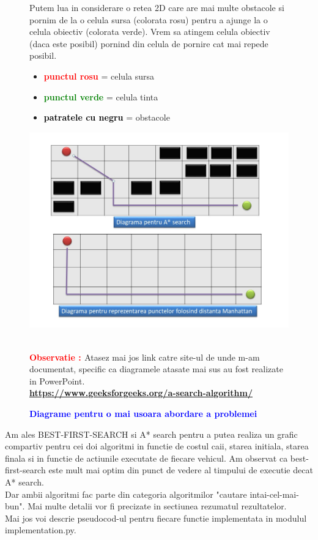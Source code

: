 \documentclass{article}
\begin{document}
\newpage
\begin{figure}
\sffamily
\quad Putem lua in considerare o retea 2D care are mai multe obstacole si pornim de la o celula sursa (colorata rosu) pentru a ajunge la o celula obiectiv (colorata verde).  Vrem sa atingem celula obiectiv (daca este posibil) pornind din celula de pornire cat mai repede posibil. \par
\newpage
  \vspace{7mm}
  \centering
  \begin{itemize}
     \item \textcolor{red}{\bfseries punctul rosu} = celula sursa
     \item \textcolor{green}{\bfseries punctul verde} = celula tinta
     \item \textcolor{black}{\bfseries patratele cu negru} = obstacole
 \end{itemize}
   \includegraphics[width=13cm]{diagrame.jpg}
  \bfseries\caption{\textbf{\textcolor{blue}{Diagrame pentru o mai usoara abordare a problemei }}}
  \vspace{2cm}
  \quad \textbf{\textcolor{red}{\\ Observatie : }}Atasez mai jos link catre site-ul de unde m-am documentat, specific ca diagramele atasate mai sus au fost realizate in PowerPoint.\\
  \bfseries{\textcolor{blue}{\url{https://www.geeksforgeeks.org/a-search-algorithm/}}}
\end{figure}

\vspace{10mm}
\quad Am ales BEST-FIRST-SEARCH si A* search pentru a putea realiza un grafic compartiv pentru cei doi algoritmi in functie de costul caii, starea initiala, starea finala si in functie de actiunile executate de fiecare vehicul. Am observat ca best-first-search este mult mai optim din punct de vedere al timpului de executie decat A* search.\\ Dar ambii algoritmi fac parte din categoria algoritmilor "cautare intai-cel-mai-bun". Mai multe detalii vor fi precizate in sectiunea rezumatul rezultatelor.
\newline \\ 
Mai jos voi descrie pseudocod-ul pentru fiecare functie implementata in modulul implementation.py.\par
\end{document}
